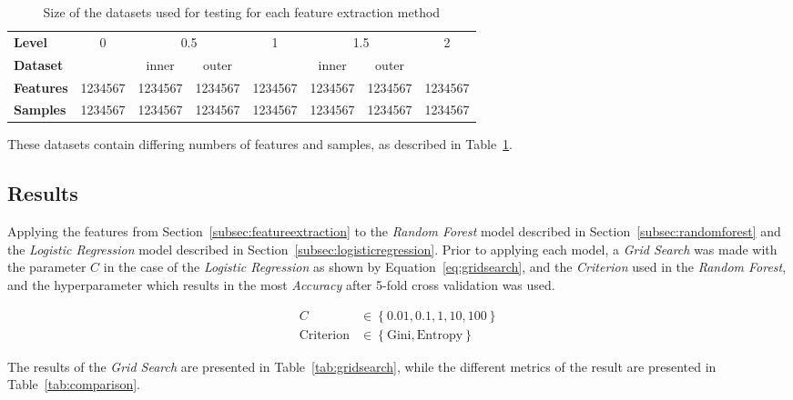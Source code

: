 \begin{table}
\centering
\begin{tabular}{>{\bfseries}l c c c c c c c}
\toprule
\textbf{Level} & 0 & \multicolumn{2}{c}{0.5} & 1 & \multicolumn{2}{c}{1.5} & 2 \\
\cmidrule(lr){3-4} \cmidrule(lr){6-7}
\textbf{Dataset} &   & inner     &    outer    &   & inner     &    outer    &   \\
\midrule
Features &\num{1234567}&\num{1234567}&\num{1234567}&\num{1234567}&\num{1234567}&\num{1234567}&\num{1234567}\\
Samples  &\num{1234567}&\num{1234567}&\num{1234567}&\num{1234567}&\num{1234567}&\num{1234567}&\num{1234567}\\
\bottomrule
\end{tabular}
\caption{Size of the datasets used for testing for each feature extraction method}
\label{tab:datasettable}
\end{table}

These datasets contain differing numbers of features and samples, as described in Table~\ref{tab:datasettable}.

\subsection{Results}

Applying the features from Section~\ref{subsec:featureextraction} to the \emph{Random Forest} model described in Section~\ref{subsec:randomforest} and the \emph{Logistic Regression} model described in Section~\ref{subsec:logisticregression}. Prior to applying each model, a \emph{Grid Search} was made with the parameter $C$ in the case of the \emph{Logistic Regression} as shown by Equation~\ref{eq:gridsearch}, and the \emph{Criterion} used in the \emph{Random Forest}, and the hyperparameter which results in the most \emph{Accuracy} after 5-fold cross validation was used.

\begin{equation}
\label{eq:gridsearch}
\begin{split}
C &\in \left\{ 0.01, 0.1, 1, 10, 100 \right\} \\
\operatorname{Criterion} &\in \left\{ \text{Gini}, \text{Entropy} \right\}
\end{split}
\end{equation}

The results of the \emph{Grid Search} are presented in Table~\ref{tab:gridsearch}, while the different metrics of the result are presented in Table~\ref{tab:comparison}.

